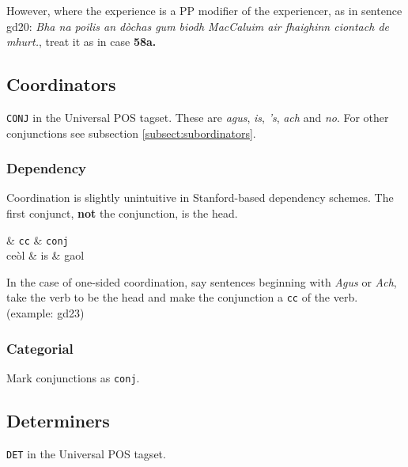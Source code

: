 \documentclass[a4paper]{article}
\begin{document}
However, where the experience is a PP modifier of the experiencer, as in sentence gd20: \textit{Bha na poilis an d\`ochas gum biodh MacCaluim air fhaighinn ciontach de mhurt.}, treat it as in case \bf 58a\rm.



\subsection{Coordinators\label{subsect:coordinators}}

\texttt{CONJ} in the Universal POS tagset.
These are \textit{agus}, \textit{is}, \textit{'s}, \textit{ach} and \textit{no}.
For other conjunctions see subsection \ref{subsect:subordinators}.

\subsubsection*{Dependency}

 Coordination is slightly unintuitive in Stanford-based dependency schemes.
The first conjunct, \textbf{not} the conjunction, is the head. 

\begin{dependency}
\begin{deptext}
 \& \texttt{cc} \& \texttt{conj} \\
ce\`ol \& is \& gaol\\\end{deptext}
\end{dependency}

 In the case of one-sided coordination, say sentences beginning with \textit{Agus} or \textit{Ach}, take the verb to be the head and make the conjunction a \texttt{cc} of the verb. (example: gd23)

\subsubsection*{Categorial}

 Mark conjunctions as \texttt{conj}. 





\subsection{Determiners\label{subsect:determiners}}

\texttt{DET} in the Universal POS tagset.
\end{document}
